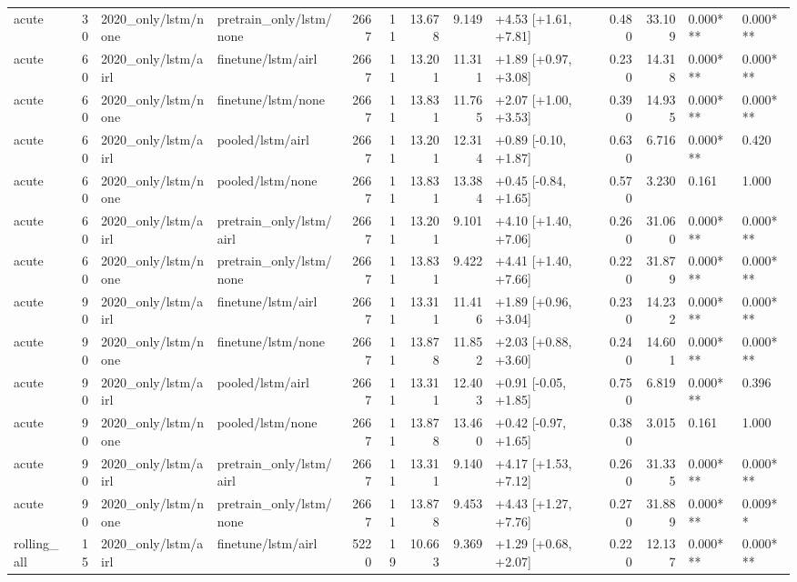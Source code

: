 \begin{tabular}{lrllrrrrlrrll}
acute & 30 & 2020_only/lstm/none & pretrain_only/lstm/none & 2667 & 11 & 13.678 & 9.149 & +4.53 [+1.61, +7.81] & 0.480 & 33.109 & 0.000*** & 0.000*** \\
acute & 60 & 2020_only/lstm/airl & finetune/lstm/airl & 2667 & 11 & 13.201 & 11.311 & +1.89 [+0.97, +3.08] & 0.230 & 14.318 & 0.000*** & 0.000*** \\
acute & 60 & 2020_only/lstm/none & finetune/lstm/none & 2667 & 11 & 13.831 & 11.765 & +2.07 [+1.00, +3.53] & 0.390 & 14.935 & 0.000*** & 0.000*** \\
acute & 60 & 2020_only/lstm/airl & pooled/lstm/airl & 2667 & 11 & 13.201 & 12.314 & +0.89 [-0.10, +1.87] & 0.630 & 6.716 & 0.000*** & 0.420 \\
acute & 60 & 2020_only/lstm/none & pooled/lstm/none & 2667 & 11 & 13.831 & 13.384 & +0.45 [-0.84, +1.65] & 0.570 & 3.230 & 0.161 & 1.000 \\
acute & 60 & 2020_only/lstm/airl & pretrain_only/lstm/airl & 2667 & 11 & 13.201 & 9.101 & +4.10 [+1.40, +7.06] & 0.260 & 31.060 & 0.000*** & 0.000*** \\
acute & 60 & 2020_only/lstm/none & pretrain_only/lstm/none & 2667 & 11 & 13.831 & 9.422 & +4.41 [+1.40, +7.66] & 0.220 & 31.879 & 0.000*** & 0.000*** \\
acute & 90 & 2020_only/lstm/airl & finetune/lstm/airl & 2667 & 11 & 13.311 & 11.416 & +1.89 [+0.96, +3.04] & 0.230 & 14.232 & 0.000*** & 0.000*** \\
acute & 90 & 2020_only/lstm/none & finetune/lstm/none & 2667 & 11 & 13.878 & 11.852 & +2.03 [+0.88, +3.60] & 0.240 & 14.601 & 0.000*** & 0.000*** \\
acute & 90 & 2020_only/lstm/airl & pooled/lstm/airl & 2667 & 11 & 13.311 & 12.403 & +0.91 [-0.05, +1.85] & 0.750 & 6.819 & 0.000*** & 0.396 \\
acute & 90 & 2020_only/lstm/none & pooled/lstm/none & 2667 & 11 & 13.878 & 13.460 & +0.42 [-0.97, +1.65] & 0.380 & 3.015 & 0.161 & 1.000 \\
acute & 90 & 2020_only/lstm/airl & pretrain_only/lstm/airl & 2667 & 11 & 13.311 & 9.140 & +4.17 [+1.53, +7.12] & 0.260 & 31.335 & 0.000*** & 0.000*** \\
acute & 90 & 2020_only/lstm/none & pretrain_only/lstm/none & 2667 & 11 & 13.878 & 9.453 & +4.43 [+1.27, +7.76] & 0.270 & 31.889 & 0.000*** & 0.009** \\
rolling_all & 15 & 2020_only/lstm/airl & finetune/lstm/airl & 5220 & 19 & 10.663 & 9.369 & +1.29 [+0.68, +2.07] & 0.220 & 12.137 & 0.000*** & 0.000*** \\

\end{tabular}
